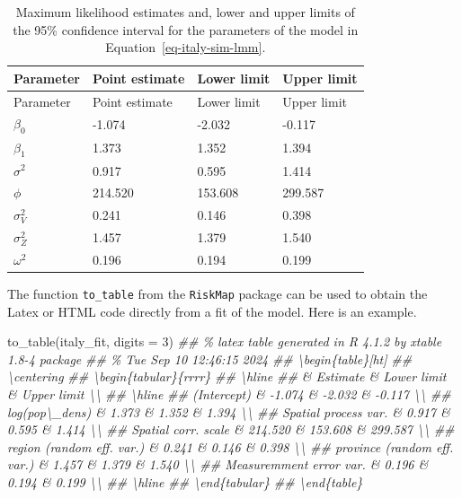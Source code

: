 \documentclass[
  letterpaper,
]{krantz}
\newenvironment{Shaded}{\begin{snugshade}}{\end{snugshade}}
\newcommand{\AttributeTok}[1]{\textcolor[rgb]{0.40,0.45,0.13}{#1}}
\newcommand{\DecValTok}[1]{\textcolor[rgb]{0.68,0.00,0.00}{#1}}
\newcommand{\DocumentationTok}[1]{\textcolor[rgb]{0.37,0.37,0.37}{\textit{#1}}}
\newcommand{\FunctionTok}[1]{\textcolor[rgb]{0.28,0.35,0.67}{#1}}
\newcommand{\NormalTok}[1]{\textcolor[rgb]{0.00,0.23,0.31}{#1}}
\begin{document}
\hypertarget{tbl-italy-sim-mle}{}
\begin{longtable}[]{@{}llll@{}}
\caption{\label{tbl-italy-sim-mle}Maximum likelihood estimates and,
lower and upper limits of the 95\% confidence interval for the
parameters of the model in
Equation~\ref{eq-italy-sim-lmm}.}\tabularnewline
\toprule\noalign{}
Parameter & Point estimate & Lower limit & Upper limit \\
\midrule\noalign{}
\endfirsthead
\toprule\noalign{}
Parameter & Point estimate & Lower limit & Upper limit \\
\midrule\noalign{}
\endhead
\bottomrule\noalign{}
\endlastfoot
\(\beta_0\) & -1.074 & -2.032 & -0.117 \\
\(\beta_1\) & 1.373 & 1.352 & 1.394 \\
\(\sigma^2\) & 0.917 & 0.595 & 1.414 \\
\(\phi\) & 214.520 & 153.608 & 299.587 \\
\(\sigma^2_{V}\) & 0.241 & 0.146 & 0.398 \\
\(\sigma^2_{Z}\) & 1.457 & 1.379 & 1.540 \\
\(\omega^2\) & 0.196 & 0.194 & 0.199 \\
\end{longtable}

The function \texttt{to\_table} from the \texttt{RiskMap} package can be
used to obtain the Latex or HTML code directly from a fit of the model.
Here is an example.

\begin{Shaded}
\begin{Highlighting}[]
\FunctionTok{to\_table}\NormalTok{(italy\_fit, }\AttributeTok{digits =} \DecValTok{3}\NormalTok{)}
\DocumentationTok{\#\# \% latex table generated in R 4.1.2 by xtable 1.8{-}4 package}
\DocumentationTok{\#\# \% Tue Sep 10 12:46:15 2024}
\DocumentationTok{\#\# \textbackslash{}begin\{table\}[ht]}
\DocumentationTok{\#\# \textbackslash{}centering}
\DocumentationTok{\#\# \textbackslash{}begin\{tabular\}\{rrrr\}}
\DocumentationTok{\#\#   \textbackslash{}hline}
\DocumentationTok{\#\#  \& Estimate \& Lower limit \& Upper limit \textbackslash{}\textbackslash{} }
\DocumentationTok{\#\#   \textbackslash{}hline}
\DocumentationTok{\#\# (Intercept) \& {-}1.074 \& {-}2.032 \& {-}0.117 \textbackslash{}\textbackslash{} }
\DocumentationTok{\#\#   log(pop\textbackslash{}\_dens) \& 1.373 \& 1.352 \& 1.394 \textbackslash{}\textbackslash{} }
\DocumentationTok{\#\#   Spatial process var. \& 0.917 \& 0.595 \& 1.414 \textbackslash{}\textbackslash{} }
\DocumentationTok{\#\#   Spatial corr. scale \& 214.520 \& 153.608 \& 299.587 \textbackslash{}\textbackslash{} }
\DocumentationTok{\#\#   region (random eff. var.) \& 0.241 \& 0.146 \& 0.398 \textbackslash{}\textbackslash{} }
\DocumentationTok{\#\#   province (random eff. var.) \& 1.457 \& 1.379 \& 1.540 \textbackslash{}\textbackslash{} }
\DocumentationTok{\#\#   Measuremment error var. \& 0.196 \& 0.194 \& 0.199 \textbackslash{}\textbackslash{} }
\DocumentationTok{\#\#    \textbackslash{}hline}
\DocumentationTok{\#\# \textbackslash{}end\{tabular\}}
\DocumentationTok{\#\# \textbackslash{}end\{table\}}
\end{Highlighting}
\end{Shaded}
\end{document}
